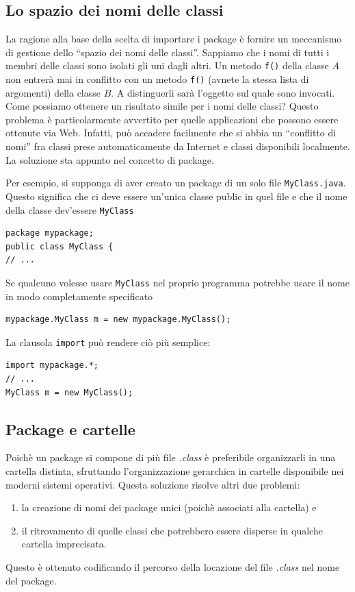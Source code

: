 \documentclass[12pt]{report}
\begin{document}
\subsection{Lo spazio dei nomi delle classi}
La ragione alla base della scelta di importare i package è fornire un meccanismo di gestione dello ``spazio dei nomi delle classi''. Sappiamo che i nomi di tutti i membri delle classi sono isolati gli uni dagli altri. Un metodo \texttt{f()} della classe $A$ non entrerà mai in conflitto con un metodo \texttt{f()} (avnete la stessa lista di argomenti) della classe $B$. A distinguerli sarà l'oggetto sul quale sono invocati. Come possiamo ottenere un risultato simile per i nomi delle classi? Questo problema è particolarmente avvertito per quelle applicazioni che possono essere ottenute via Web. Infatti, può accadere facilmente che si abbia un ``conflitto di nomi'' fra classi prese automaticamente da Internet e classi disponibili localmente. La soluzione sta appunto nel concetto di package.

Per esempio, si supponga di aver creato un package di un solo file \texttt{MyClass.java}. Questo significa che ci deve essere un'unica classe public in quel file e che il nome della classe dev'essere \texttt{MyClass}
\begin{lstlisting}[style=javastyle]
package mypackage;
public class MyClass {
// ...
\end{lstlisting}
Se qualcuno volesse usare \texttt{MyClass} nel proprio programma potrebbe usare il nome in modo completamente specificato
\begin{lstlisting}[style=javastyle]
mypackage.MyClass m = new mypackage.MyClass();
\end{lstlisting}
La clausola \texttt{import} può rendere ciò più semplice:
\begin{lstlisting}[style=javastyle]
import mypackage.*;
// ...
MyClass m = new MyClass();
\end{lstlisting}
\subsection{Package e cartelle}
Poichè un package si compone di più file \textit{.class} è preferibile organizzarli in una cartella distinta, sfruttando l'organizzazione gerarchica in cartelle disponibile nei moderni sistemi operativi. Questa soluzione risolve altri due problemi:
\begin{enumerate}
	\item la creazione di nomi dei package unici (poichè associati alla cartella) e
	\item il ritrovamento di quelle classi che potrebbero essere disperse in qualche cartella imprecisata.
\end{enumerate}
Questo è ottenuto codificando il percorso della locazione del file \textit{.class} nel nome del package.
\end{document}
